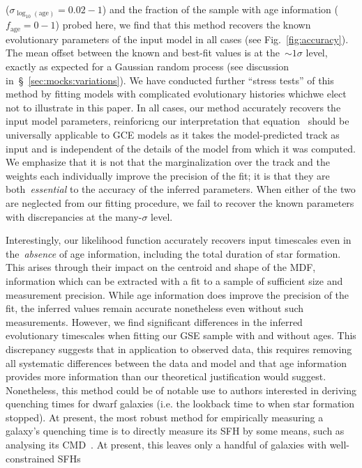 \documentclass[ms.tex]{subfiles}
\begin{document}
($\sigma_{\log_{10}(\text{age})} = 0.02 - 1$) and the fraction of the sample
with age information ($f_\text{age} = 0 - 1$) probed here, we find that this
method recovers the known evolutionary parameters of the input model in all
cases (see Fig.~\ref{fig:accuracy}).
The mean offset between the known and best-fit values is at the~$\sim 1 \sigma$
level, exactly as expected for a Gaussian random process (see discussion
in~\S~\ref{sec:mocks:variations}).
We have conducted further ``stress tests'' of this method by fitting models
with complicated evolutionary histories whichwe elect not to illustrate in this
paper.
In all cases, our method accurately recovers the input model parameters,
reinforicng our interpretation that equation~ should be
universally applicable to GCE models as it takes the model-predicted track as
input and is independent of the details of the model from which it was
computed.
We emphasize that it is not that the marginalization over the track and the
weights each individually improve the precision of the fit; it is that they
are both~\textit{essential} to the accuracy of the inferred parameters.
When either of the two are neglected from our fitting procedure, we fail to
recover the known parameters with discrepancies at the many-$\sigma$ level.
\par
Interestingly, our likelihood function accurately recovers input timescales
even in the~\textit{absence} of age information, including the total duration
of star formation.
This arises through their impact on the centroid and shape of the MDF,
information which can be extracted with a fit to a sample of sufficient size
and measurement precision.
While age information does improve the precision of the fit, the inferred
values remain accurate nonetheless even without such measurements.
However, we find significant differences in the inferred evolutionary
timescales when fitting our GSE sample with and without ages.
This discrepancy suggests that in application to observed data, this requires
removing all systematic differences between the data and model and that age
information provides more information than our theoretical justification would
suggest.
Nonetheless, this method could be of notable use to authors interested in
deriving quenching times for dwarf galaxies (i.e. the lookback time to when
star formation stopped).
At present, the most robust method for empirically measuring a galaxy's
quenching time is to directly measure its SFH by some means, such as analysing
its CMD~\citep[e.g.][]{Sohn2013, Weisz2015}.
At present, this leaves only a handful of galaxies with well-constrained SFHs
\end{document}
